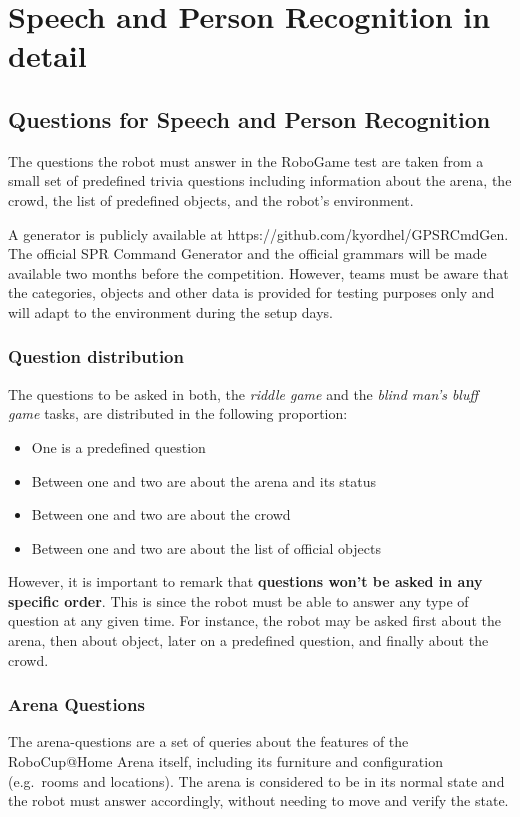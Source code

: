 \chapter{Speech and Person Recognition in detail}
\label{chap:robogame-appendix}

\section{Questions for Speech and Person Recognition}
The questions the robot must answer in the RoboGame test are taken from a small set of predefined trivia questions including information about the arena, the crowd, the list of predefined objects, and the robot's environment.

A generator is publicly available at https://github.com/kyordhel/GPSRCmdGen. The official SPR Command Generator and the official grammars will be made available two months before the competition. However, teams must be aware that the categories, objects and other data is provided for testing purposes only and will adapt to the environment during the setup days.

\subsection{Question distribution}
The questions to be asked in both, the \textit{riddle game} and the \textit{blind man's bluff game} tasks, are distributed in the following proportion:
\begin{itemize}
    \item One is a predefined question
    \item Between one and two are about the arena and its status
    \item Between one and two are about the crowd
    \item Between one and two are about the list of official objects
\end{itemize}
However, it is important to remark that \textbf{questions won't be asked in any specific order}. This is since the robot must be able to answer any type of question at any given time. For instance, the robot may be asked first about the arena, then about object, later on a predefined question, and finally about the crowd.

\subsection{Arena Questions}
The arena-questions are a set of queries about the features of the RoboCup@Home Arena itself, including its furniture and configuration (e.g.~rooms and locations). The arena is considered to be in its normal state and the robot must answer accordingly, without needing to move and verify the state.

